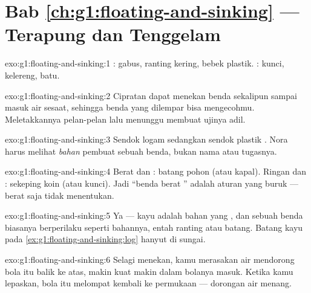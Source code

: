 \section*{Bab \ref{ch:g1:floating-and-sinking} --- Terapung dan Tenggelam}

\begin{solution}{exo:g1:floating-and-sinking:1}
: gabus, ranting kering, bebek plastik. : kunci,
kelereng, batu.
\end{solution}

\begin{solution}{exo:g1:floating-and-sinking:2}
Cipratan dapat menekan benda  sekalipun sampai masuk air
sesaat, sehingga benda yang dilempar bisa mengecohmu. Meletakkannya
pelan-pelan lalu menunggu membuat ujinya adil.
\end{solution}

\begin{solution}{exo:g1:floating-and-sinking:3}
Sendok logam  sedangkan sendok plastik . Nora harus
melihat \emph{bahan} pembuat sebuah benda, bukan nama atau tugasnya.
\end{solution}

\begin{solution}{exo:g1:floating-and-sinking:4}
Berat dan : batang pohon (atau kapal). Ringan dan :
sekeping koin (atau kunci). Jadi ``benda berat '' adalah
aturan yang buruk --- berat saja tidak menentukan.
\end{solution}

\begin{solution}{exo:g1:floating-and-sinking:5}
Ya --- kayu adalah bahan yang , dan sebuah benda biasanya
berperilaku seperti bahannya, entah ranting atau batang. Batang kayu
pada \cref{ex:g1:floating-and-sinking:log} hanyut  di sungai.
\end{solution}

\begin{solution}{exo:g1:floating-and-sinking:6}
Selagi menekan, kamu merasakan air mendorong bola itu balik ke atas,
makin kuat makin dalam bolanya masuk. Ketika kamu lepaskan, bola itu
melompat kembali ke permukaan --- dorongan air menang.
\end{solution}

